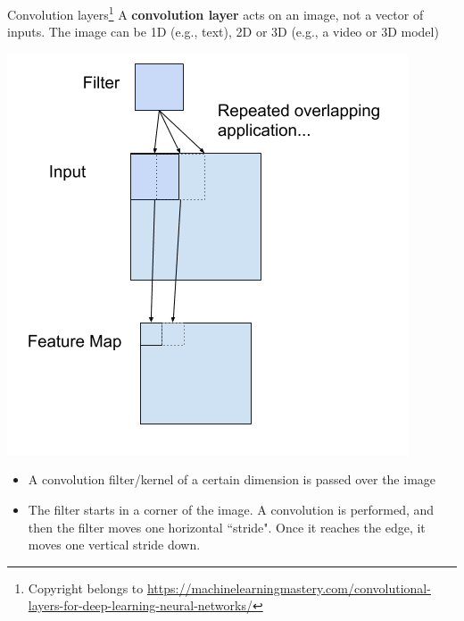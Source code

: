 \documentclass{beamer}
\begin{document}
\begin{frame}{Convolution layers\footnote{Copyright belongs to \url{https://machinelearningmastery.com/convolutional-layers-for-deep-learning-neural-networks/}}}
A \textbf{convolution layer} acts on an image, not a vector of inputs. The image can be 1D (e.g., text), 2D or 3D (e.g., a video or 3D model)
\begin{minipage}{0.49\linewidth}
\includegraphics[width=\textwidth]{Images/cfilter.png}
\end{minipage}
\begin{minipage}{0.49\linewidth}
\begin{itemize}
\item A convolution filter/kernel of a certain dimension is passed over the image
\item The filter starts in a corner of the image. A convolution is performed, and then the filter moves one horizontal ``stride". Once it reaches the edge, it moves one vertical stride down. 
\end{itemize}
\end{minipage}
\end{frame}
\end{document}
